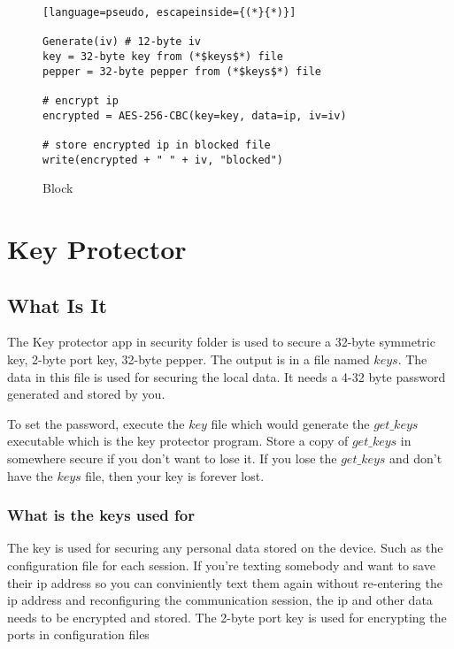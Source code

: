 \documentclass[a4paper,12pt]{article}
\begin{document}
\begin{figure}[htb]
\begin{small}
\begin{lstlisting}[language=pseudo, escapeinside={(*}{*)}]

Generate(iv) # 12-byte iv
key = 32-byte key from (*$keys$*) file
pepper = 32-byte pepper from (*$keys$*) file

# encrypt ip
encrypted = AES-256-CBC(key=key, data=ip, iv=iv)

# store encrypted ip in blocked file
write(encrypted + " " + iv, "blocked")

\end{lstlisting}
\end{small}
\caption{Block}\label{blocking}
\end{figure}

\section{Key Protector}


\subsection{What Is It}

The Key protector app in security folder is used to secure a 32-byte symmetric key, 2-byte port key, 32-byte pepper. The output is in a file named $keys$. The data in this file is used for securing the local data. It needs a 4-32 byte password generated and stored by you. 

To set the password, execute the $key$ file which would generate the $get\_keys$ executable which is the key protector program. Store a copy of $get\_keys$ in somewhere secure if you don't want to lose it. If you lose the $get\_keys$ and don't have the $keys$ file, then your key is forever lost.

\subsubsection{What is the keys used for}

The key is used for securing any personal data stored on the device. Such as the configuration file for each session. If you're texting somebody and want to save their ip address so you can conviniently text them again without re-entering the ip address and reconfiguring the communication session, the ip and other data needs to be encrypted and stored.
The 2-byte port key is used for encrypting the ports in configuration files
\end{document}
